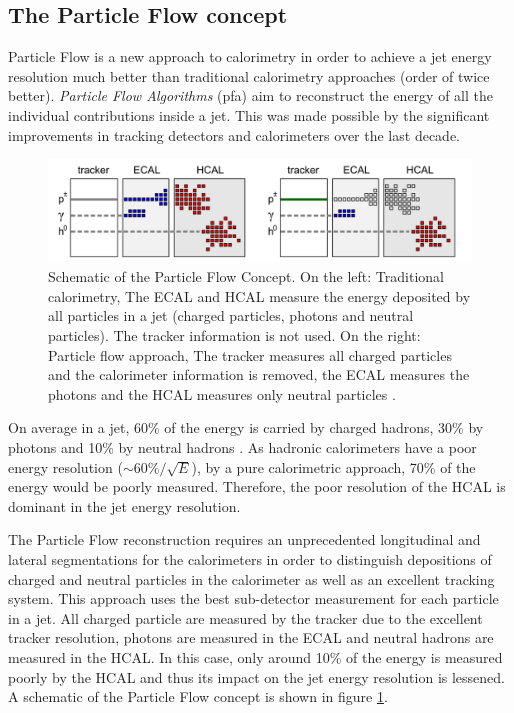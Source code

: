 \subsection{The Particle Flow concept}

Particle Flow is a new approach to calorimetry in order to achieve a jet energy resolution much better than traditional calorimetry approaches (order of twice better). \textit{Particle Flow Algorithms} (\acrshort{pfa}) aim to reconstruct the energy of all the individual contributions inside a jet. This was made possible by the significant improvements in tracking detectors and calorimeters over the last decade.

\begin{figure}[htbp!]
  \centering
  \includegraphics[width=1\linewidth]{chap2/fig/PFAConcept.png}
  \caption{Schematic of the Particle Flow Concept. On the left: Traditional calorimetry, The ECAL and HCAL measure the energy deposited by all particles in a jet (charged particles, photons and neutral particles). The tracker information is not used. On the right: Particle flow approach, The tracker measures all charged particles and the calorimeter information is removed, the ECAL measures the photons and the HCAL measures only neutral particles \cite{Feege:2011dsa}.} \label{fig:PFAConcept}
\end{figure}

On average in a jet, 60\% of the energy is carried by charged hadrons, 30\% by photons and 10\% by neutral hadrons \cite{Ebrahimi:394104}. As hadronic calorimeters have a poor energy resolution ($\sim 60\%/\sqrt{E}$), by a pure calorimetric approach, 70\% of the energy would be poorly measured. Therefore, the poor resolution of the HCAL is dominant in the jet energy resolution.

The Particle Flow reconstruction requires an unprecedented longitudinal and lateral segmentations for the calorimeters in order to distinguish depositions of charged and neutral particles in the calorimeter as well as an excellent tracking system. This approach uses the best sub-detector measurement for each particle in a jet. All charged particle are measured by the tracker due to the excellent tracker resolution, photons are measured in the ECAL and neutral hadrons are measured in the HCAL. In this case, only around 10\% of the energy is measured poorly by the HCAL and thus its impact on the jet energy resolution is lessened. A schematic of the Particle Flow concept is shown in figure \ref{fig:PFAConcept}.

